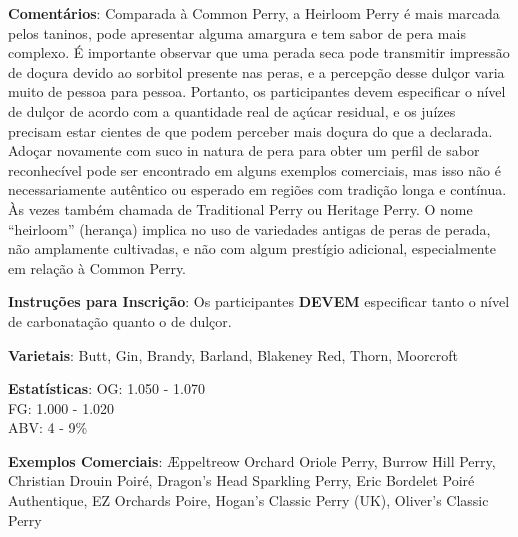 \textbf{Comentários}: Comparada à Common Perry, a Heirloom Perry é mais marcada pelos taninos, pode apresentar alguma amargura e tem sabor de pera mais complexo. É importante observar que uma perada seca pode transmitir impressão de doçura devido ao sorbitol presente nas peras, e a percepção desse dulçor varia muito de pessoa para pessoa. Portanto, os participantes devem especificar o nível de dulçor de acordo com a quantidade real de açúcar residual, e os juízes precisam estar cientes de que podem perceber mais doçura do que a declarada. Adoçar novamente com suco in natura de pera para obter um perfil de sabor reconhecível pode ser encontrado em alguns exemplos comerciais, mas isso não é necessariamente autêntico ou esperado em regiões com tradição longa e contínua. Às vezes também chamada de Traditional Perry ou Heritage Perry. O nome “heirloom” (herança) implica no uso de variedades antigas de peras de perada, não amplamente cultivadas, e não com algum prestígio adicional, especialmente em relação à Common Perry.

\textbf{Instruções para Inscrição}: Os participantes \textbf{DEVEM} especificar tanto o nível de carbonatação quanto o de dulçor.

\textbf{Varietais}: Butt, Gin, Brandy, Barland, Blakeney Red, Thorn, Moorcroft

\textbf{Estatísticas}: OG: 1.050 - 1.070 \\
\phantom{ } \hspace{16.5mm} FG: 1.000 - 1.020 \\
\phantom{ } \hspace{16.5mm} ABV: 4 - 9\%

\textbf{Exemplos Comerciais}: Æppeltreow Orchard Oriole Perry, Burrow Hill Perry, Christian Drouin Poiré, Dragon's Head Sparkling Perry, Eric Bordelet Poiré Authentique, EZ Orchards Poire, Hogan's Classic Perry (UK), Oliver's Classic Perry